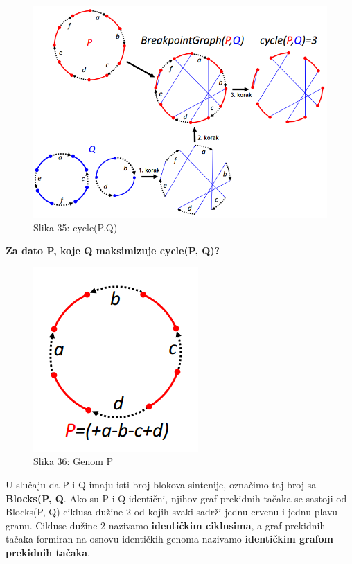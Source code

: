 \documentclass{article}
\begin{document}
\begin{figure}[h!]
\centering
\includegraphics[scale=0.55]{slike/cycle.PNG}
\caption{Slika 35: cycle(P,Q)}
\label{slika:X}
\end{figure}
\newpage
\noindent \textbf{ Za dato P, koje Q maksimizuje cycle(P, Q)?}\\

\begin{figure}[h!]
\centering
\includegraphics[scale=0.7]{slike/Pabcd.PNG}
\caption{Slika 36: Genom P}
\label{slika:X}
\end{figure}

U slučaju da P i Q imaju isti broj blokova sintenije, označimo taj broj sa \textbf{Blocks(P, Q}. Ako su P i Q identični, njihov graf prekidnih tačaka se sastoji od Blocks(P, Q) ciklusa dužine 2 od kojih svaki sadrži jednu crvenu i jednu plavu granu. Cikluse dužine 2 nazivamo \textbf{identičkim ciklusima}, a graf prekidnih tačaka formiran na osnovu identičkih genoma nazivamo \textbf{identičkim grafom prekidnih tačaka}.
\end{document}
